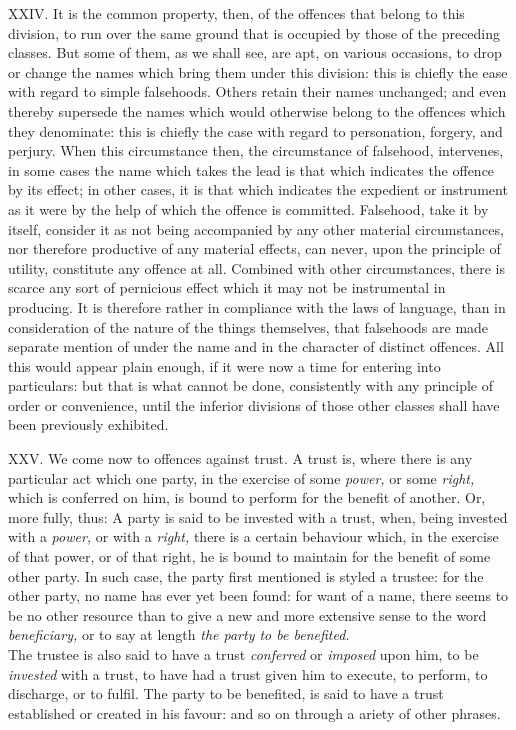\documentclass[12pt]{report}
\begin{document}
XXIV. It is the common property, then, of the offences that belong to
this division, to run over the same ground that is occupied by those of
the preceding classes. But some of them, as we shall see, are apt, on
various occasions, to drop or change the names which bring them under
this division: this is chiefly the ease with regard to simple
falsehoods. Others retain their names unchanged; and even thereby
supersede the names which would otherwise belong to the offences which
they denominate: this is chiefly the case with regard to personation,
forgery, and perjury. When this circumstance then, the circumstance of
falsehood, intervenes, in some cases the name which takes the lead is
that which indicates the offence by its effect; in other cases, it is
that which indicates the expedient or instrument as it were by the help
of which the offence is committed. Falsehood, take it by itself,
consider it as not being accompanied by any other material
circumstances, nor therefore productive of any material effects, can
never, upon the principle of utility, constitute any offence at all.
Combined with other circumstances, there is scarce any sort of
pernicious effect which it may not be instrumental in producing. It is
therefore rather in compliance with the laws of language, than in
consideration of the nature of the things themselves, that falsehoods
are made separate mention of under the name and in the character of
distinct offences. All this would appear plain enough, if it were now a
time for entering into particulars: but that is what cannot be done,
consistently with any principle of order or convenience, until the
inferior divisions of those other classes shall have been previously
exhibited.

XXV. We come now to offences against trust. A trust is, where there is
any particular act which one party, in the exercise of some
\emph{power,} or some \emph{right,} which is conferred on him, is bound
to perform for the benefit of another. Or, more fully, thus: A party is
said to be invested with a trust, when, being invested with a
\emph{power,} or with a \emph{right,} there is a certain behaviour
which, in the exercise of that power, or of that right, he is bound to
maintain for the benefit of some other party. In such case, the party
first mentioned is styled a trustee: for the other party, no name has
ever yet been found: for want of a name, there seems to be no other
resource than to give a new and more extensive sense to the word
\emph{beneficiary,} or to say at length \emph{the party to be
benefited.} \emph{\\
}The trustee is also said to have a trust \emph{conferred} or
\emph{imposed} upon him, to be \emph{invested} with a trust, to have had
a trust given him to execute, to perform, to discharge, or to fulfil.
The party to be benefited, is said to have a trust established or
created in his favour: and so on through a ariety of other phrases.
\end{document}
